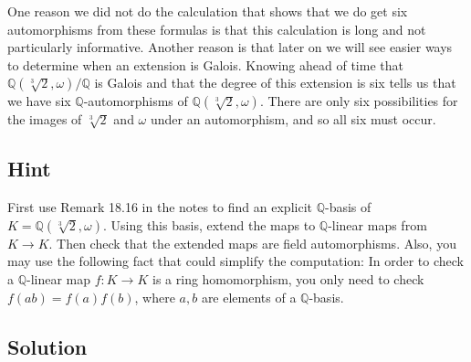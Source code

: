 \documentclass[fleqn]{article}
\begin{document}
        One reason we did not do the calculation that shows that we do get six automorphisms from these formulas is that this calculation is long and not particularly informative.  Another reason is that later on we will see easier ways to determine when an extension is Galois.  Knowing ahead of time that $\mathbb{Q}\left(\sqrt[3]{2}, \omega\right)/\mathbb{Q}$ is Galois and that the degree of this extension is six tells us that we have six $\mathbb{Q}$-automorphisms of $\mathbb{Q}\left(\sqrt[3]{2}, \omega\right)$.  There are only six possibilities for the images of $\sqrt[3]{2}$ and $\omega$ under an automorphism, and so all six must occur.
        
        \subsection{Hint}
        First use Remark 18.16 in the notes to find an explicit $\mathbb{Q}$-basis of $K = \mathbb{Q}\left(\sqrt[3]{2}, \omega\right)$.  Using this basis, extend the maps to $\mathbb{Q}$-linear maps from $K \to K$.  Then check that the extended maps are field automorphisms.  Also, you may use the following fact that could simplify the computation:  In order to check a $\mathbb{Q}$-linear map $f: K \to K$ is a ring homomorphism, you only need to check $f(ab) = f(a) f(b)$, where $a, b$ are elements of a $\mathbb{Q}$-basis.
        
        \subsection{Solution}
        
    
\end{document}
